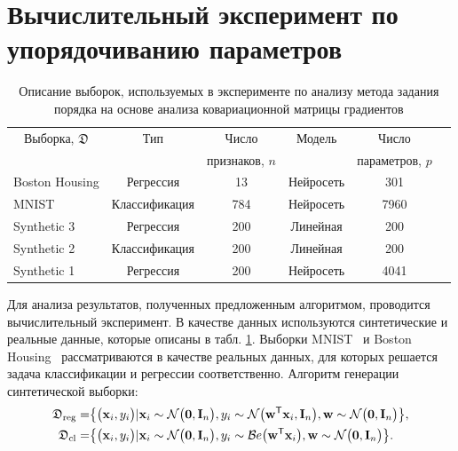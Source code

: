 \section{Вычислительный эксперимент по упорядочиванию параметров}

\begin{table}[h!t]
\begin{center}
\caption{Описание выборок, используемых в эксперименте по анализу метода задания порядка на основе анализа ковариационной матрицы градиентов}
\label{ch-5:tb:ex:1}
\begin{tabular}{|c|c|c|c|c|c|}
\hline
	Выборка, $\mathfrak{D}$& Тип & Число& Модель& Число \\
	&& признаков, $n$&&параметров, $p$\\
	\hline
	\multicolumn{1}{|l|}{Boston Housing}&
	Регрессия& 13& Нейросеть& 301\\
	\hline
	\multicolumn{1}{|l|}{MNIST}&
	Классификация& 784& Нейросеть& 7960\\
	\hline
	\multicolumn{1}{|l|}{Synthetic 3}&
	Регрессия& 200& Линейная& 200\\
	\hline
	\multicolumn{1}{|l|}{Synthetic 2}&
	Классификация& 200& Линейная& 200\\
	\hline
	\multicolumn{1}{|l|}{Synthetic 1}&
	Регрессия& 200& Нейросеть& 4041\\
\hline

\end{tabular}
\end{center}
\end{table}

Для анализа результатов, полученных предложенным алгоритмом, проводится вычислительный эксперимент. В качестве данных используются синтетические и реальные данные, которые описаны в табл. \ref{ch-5:tb:ex:1}. Выборки MNIST~\cite{mnist} и Boston Housing~\cite{Boston} рассматриваются в качестве реальных данных, для которых решается задача классификации и регрессии соответственно. Алгоритм генерации синтетической выборки:
\[
\label{eq:ex:1}
\begin{aligned}
\mathfrak{D}_{\text{\text{reg}}} &= \bigr\{\bigr(\textbf{x}_i, y_i \bigr) |\textbf{x}_{i}\sim\mathcal{N}\bigr(\textbf{0}, \textbf{I}_{n}\bigr), y_{i}\sim\mathcal{N}\bigr(\textbf{w}^{\mathsf{T}}\textbf{x}_{i}, \textbf{I}_{n}\bigr),  \textbf{w} \sim \mathcal{N}\bigr(\textbf{0}, \textbf{I}_{n}\bigr)\bigr\},\\
\mathfrak{D}_{\text{\text{cl}}} &= \bigr\{\bigr(\textbf{x}_i, y_i \bigr) |\textbf{x}_{i}\sim\mathcal{N}\bigr(\textbf{0}, \textbf{I}_{n}\bigr), y_{i}\sim\mathcal{B}e\bigr(\textbf{w}^{\mathsf{T}}\textbf{x}_{i}\bigr),  \textbf{w} \sim \mathcal{N}\bigr(\textbf{0}, \textbf{I}_{n}\bigr)\bigr\}.
\end{aligned}
\]

